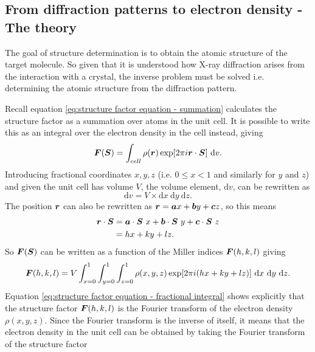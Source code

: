     \subsection{From diffraction patterns to electron density - The theory}
    \label{sub:From diffraction patterns to electron density - The theory}
        The goal of structure determination is to obtain the atomic structure of the target molecule. So given that it is understood how X-ray diffraction arises from the interaction with a crystal, the inverse problem must be solved i.e. determining the atomic structure from the diffraction pattern.

        Recall equation \ref{eq:structure factor equation - summation} calculates the structure factor as a summation over atoms in the unit cell. It is possible to write this as an integral over the electron density in the cell instead, giving
        \begin{equation}
            \boldsymbol{F}(\boldsymbol{S}) = \int_{cell} \rho(\boldsymbol{r})\exp[2 \pi i \boldsymbol{r} \cdot \boldsymbol{S}]\ \mathrm{d}v.
            \label{eq:structure factor equation - integral}
        \end{equation}
        Introducing fractional coordinates $x, y, z$ (i.e. $0 \leq x < 1$ and similarly for $y$ and $z$) and given the unit cell has volume $V$, the volume element, $\mathrm{d}v$, can be rewritten as
        \begin{equation}
            \mathrm{d}v = V \times \mathrm{d}x\ \mathrm{d}y\ \mathrm{d}z.
        \end{equation}
        The position $\boldsymbol{r}$ can also be rewritten as $\boldsymbol{r} = \boldsymbol{a}x + \boldsymbol{b}y + \boldsymbol{c}z$, so this means
        \begin{align}
            \boldsymbol{r} \cdot \boldsymbol{S} &= \boldsymbol{a}\cdot\boldsymbol{S}\ x + \boldsymbol{b}\cdot\boldsymbol{S}\ y + \boldsymbol{c}\cdot\boldsymbol{S}\ z \\
            &= hx + ky + lz.
        \end{align}
        So $\boldsymbol{F}(\boldsymbol{S})$ can be written as a function of the Miller indices $\boldsymbol{F}(h,k,l)$ giving
        \begin{equation}
            \bs{F}(h,k,l) = V \int_{x=0}^1 \int_{y=0}^1 \int_{z=0}^1 \rho(x,y,z) \exp[2\pi i (hx + ky + lz)]\ \mathrm{d}x\ \mathrm{d}y\ \mathrm{d}z.
            \label{eq:structure factor equation - fractional integral}
        \end{equation}
        Equation \ref{eq:structure factor equation - fractional integral} shows explicitly that the structure factor $\boldsymbol{F}(h,k,l)$ is the Fourier transform of the electron density $\rho(x,y,z)$. Since the Fourier transform is the inverse of itself, it means that the electron density in the unit cell can be obtained by taking the Fourier transform of the structure factor
